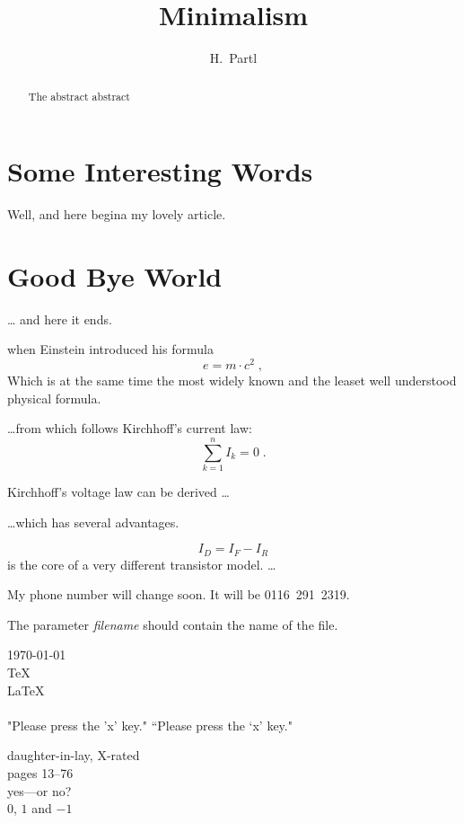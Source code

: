 \documentclass[11pt,twoside,a4paper]{article}
\author{H.~Partl}
\title{Minimalism}
\begin{document}
\maketitle

\begin{abstract}
    The abstract abstract
\end{abstract}

\tableofcontents
\section{Some Interesting Words}
Well, and here begina my lovely article.
\section{Good Bye World}
\ldots{} and here it ends.

when Einstein introduced his formula
\begin{equation}
    e = m \cdot c^2 \; ,
\end{equation}
Which is at the same time the most widely known
and the leaset well understood physical formula.


\ldots from which follows Kirchhoff's current law:
\begin{equation}
    \sum_{k=1}^{n} I_k = 0 \; .
\end{equation}

Kirchhoff's voltage law can be derived \ldots


\ldots which has several advantages.

\begin{equation}
    I_D = I_F - I_R
\end{equation}
is the core of a very different transistor model. \ldots

My phone number will change soon.
It will be \mbox{0116 291 2319}.

The parameter
\mbox{\emph{filename}} should
contain the name of the file.


\today\\
\TeX\\
\LaTeX\\
\LaTeXe\\

"Please press the 'x' key."
``Please press the `x' key."

daughter-in-lay, X-rated\\
pages 13--76\\
yes---or no?\\
$0$, $1$ and $-1$
\end{document}
